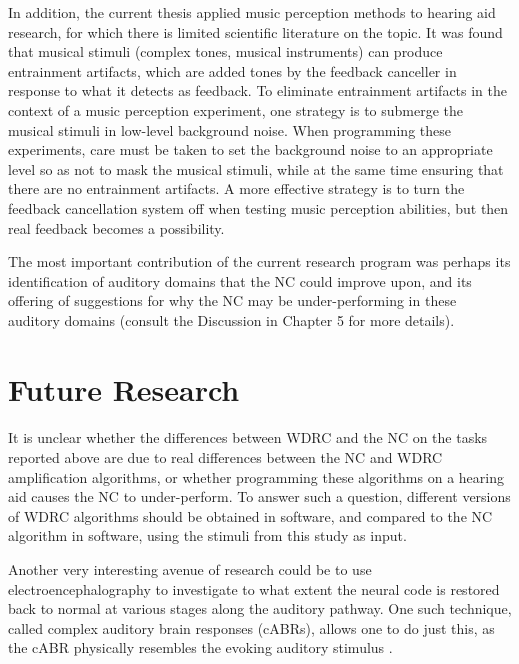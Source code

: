 In addition, the current thesis applied music perception methods to hearing aid research, for which there is limited scientific literature on the topic.  It was found that musical stimuli (complex tones, musical instruments) can produce entrainment artifacts, which are added tones by the feedback canceller in response to what it detects as feedback.  To eliminate entrainment artifacts in the context of a music perception experiment, one strategy is to submerge the musical stimuli in low-level background noise.  When programming these experiments, care must be taken to set the background noise to an appropriate level so as not to mask the musical stimuli, while at the same time ensuring that there are no entrainment artifacts.  A more effective strategy is to turn the feedback cancellation system off when testing music perception abilities, but then real feedback becomes a possibility.

The most important contribution of the current research program was perhaps its identification of auditory domains that the NC could improve upon, and its offering of suggestions for why the NC may be under-performing in these auditory domains (consult the Discussion in Chapter 5 for more details).

\section{Future Research}
\paragraph{}It is unclear whether the differences between WDRC and the NC on the tasks reported above are due to real differences between the NC and WDRC amplification algorithms, or whether programming these algorithms on a hearing aid causes the NC to under-perform.  To answer such a question, different versions of WDRC algorithms should be obtained in software, and compared to the NC algorithm in software, using the stimuli from this study as input.

Another very interesting avenue of research could be to use electroencephalography to investigate to what extent the neural code is restored back to normal at various stages along the auditory pathway.  One such technique, called complex auditory brain responses (cABRs), allows one to do just this, as the cABR physically resembles the evoking auditory stimulus \cite{Anderson2010}.  